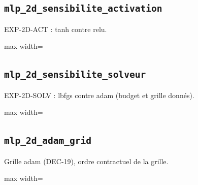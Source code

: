 \documentclass[a4paper,10pt]{article}
\newcommand{\tablesroot}{results/tables}
\begin{document}
\noindent\begin{minipage}{\linewidth}
\subsection*{\texttt{mlp\_2d\_sensibilite\_activation}}
EXP-2D-ACT : tanh contre relu.
\par
\begingroup\centering\footnotesize
\begin{adjustbox}{max width=\linewidth}

\end{adjustbox}\par
\endgroup
\end{minipage}
\par\medskip

\noindent\begin{minipage}{\linewidth}
\subsection*{\texttt{mlp\_2d\_sensibilite\_solveur}}
EXP-2D-SOLV : lbfgs contre adam (budget et grille donn\'es).
\par
\begingroup\centering\footnotesize
\begin{adjustbox}{max width=\linewidth}

\end{adjustbox}\par
\endgroup
\end{minipage}
\par\medskip

\noindent\begin{minipage}{\linewidth}
\subsection*{\texttt{mlp\_2d\_adam\_grid}}
Grille adam (DEC-19), ordre contractuel de la grille.
\par
\begingroup\centering\footnotesize
\begin{adjustbox}{max width=\linewidth}

\end{adjustbox}\par
\endgroup
\end{minipage}
\par\medskip
\end{document}

